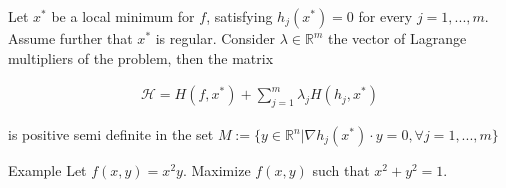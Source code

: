 \documentclass[aspectratio=169]{beamer}
\begin{document}
\begin{frame}
    \begin{theorem}
        Let $x^*$ be a local minimum for $f$, satisfying $h_j(x^*)=0$ for every $j=1,...,m$. Assume further that $x^*$ is regular. Consider $\lambda\in\mathds{R}^m$ the vector of Lagrange multipliers of the problem, then the matrix
        
        \begin{align*}
            \mathcal{H}=H(f,x^*)+\sum_{j=1}^m\lambda_j H(h_j,x^*)
        \end{align*}
        
        is positive semi definite in the set $M:=\{y\in\mathds{R}^n|\nabla h_j(x^*)\cdot y=0,\forall j=1,...,m\}$
        
        
    \end{theorem}
\end{frame}

\begin{frame}{Example}
    Let $f(x,y)=x^2y$. Maximize $f(x,y)$ such that $x^2+y^2=1$.
\end{frame}
\end{document}
